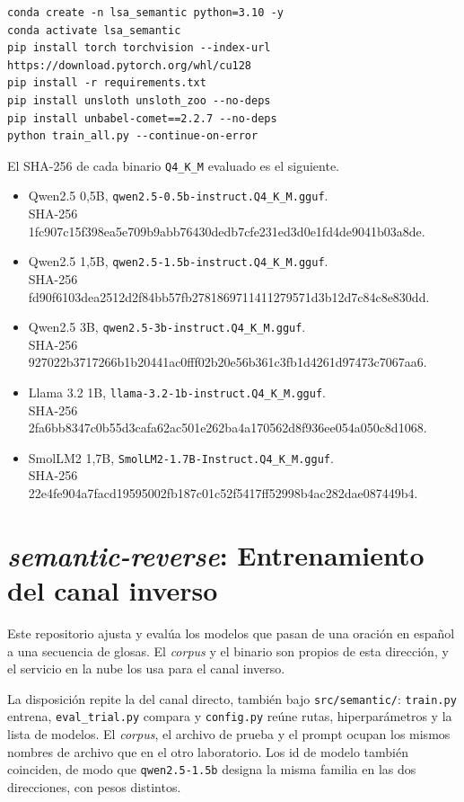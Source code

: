 \begin{lstlisting}
conda create -n lsa_semantic python=3.10 -y
conda activate lsa_semantic
pip install torch torchvision --index-url https://download.pytorch.org/whl/cu128
pip install -r requirements.txt
pip install unsloth unsloth_zoo --no-deps
pip install unbabel-comet==2.2.7 --no-deps
python train_all.py --continue-on-error

\end{lstlisting}

El SHA-256 de cada binario \texttt{Q4\_K\_M} evaluado es el siguiente.
\begin{itemize}
    \item Qwen2.5 0,5B, \texttt{qwen2.5-0.5b-instruct.Q4\_K\_M.gguf}.\\
SHA-256 {\ttfamily\small  1fc907c15f398ea5e709b9abb76430de\allowbreak db7cfe231ed3d0e1fd4de9041b03a8de}.
    \item Qwen2.5 1,5B, \texttt{qwen2.5-1.5b-instruct.Q4\_K\_M.gguf}.\\
SHA-256 {\ttfamily\small  fd90f6103dea2512d2f84bb57fb27818\allowbreak 69711411279571d3b12d7c84c8e830dd}.
    \item Qwen2.5 3B, \texttt{qwen2.5-3b-instruct.Q4\_K\_M.gguf}.\\
SHA-256 {\ttfamily\small  927022b3717266b1b20441ac0fff02b2\allowbreak 0e56b361c3fb1d4261d97473c7067aa6}.
    \item Llama 3.2 1B, \texttt{llama-3.2-1b-instruct.Q4\_K\_M.gguf}.\\
SHA-256 {\ttfamily\small  2fa6bb8347c0b55d3cafa62ac501e262\allowbreak ba4a170562d8f936ee054a050c8d1068}.
    \item SmolLM2 1,7B, \texttt{SmolLM2-1.7B-Instruct.Q4\_K\_M.gguf}.\\
SHA-256 {\ttfamily\small  22e4fe904a7facd19595002fb187c01c\allowbreak 52f5417ff52998b4ac282dae087449b4}.
\end{itemize}

\section{\textit{semantic-reverse}: Entrenamiento del canal inverso}
Este repositorio ajusta y evalúa los modelos que pasan de una oración en español a una secuencia de glosas. El \textit{corpus} y el binario son propios de esta dirección, y el servicio en la nube los usa para el canal inverso.

La disposición repite la del canal directo, también bajo \texttt{src/semantic/}: \texttt{train.py} entrena, \texttt{eval\_trial.py} compara y \texttt{config.py} reúne rutas, hiperparámetros y la lista de modelos. El \textit{corpus}, el archivo de prueba y el prompt ocupan los mismos nombres de archivo que en el otro laboratorio. Los id de modelo también coinciden, de modo que \texttt{qwen2.5-1.5b} designa la misma familia en las dos direcciones, con pesos distintos.

